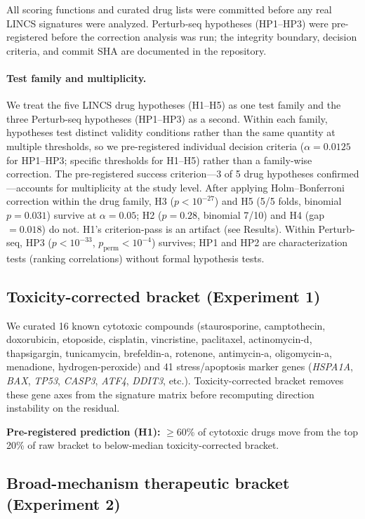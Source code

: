 \documentclass{article}
\begin{document}
All scoring functions and curated drug lists were committed before any real
LINCS signatures were analyzed. Perturb-seq hypotheses (HP1--HP3) were
pre-registered before the correction analysis was run; the integrity
boundary, decision criteria, and commit SHA are documented in the
repository.

\paragraph{Test family and multiplicity.}
We treat the five LINCS drug hypotheses (H1--H5) as one test family and the
three Perturb-seq hypotheses (HP1--HP3) as a second. Within each family,
hypotheses test distinct validity conditions rather than the same quantity at
multiple thresholds, so we pre-registered individual decision criteria
($\alpha = 0.0125$ for HP1--HP3; specific thresholds for H1--H5) rather than
a family-wise correction. The pre-registered success criterion---3 of 5 drug
hypotheses confirmed---accounts for multiplicity at the study level.
After applying Holm--Bonferroni correction within the drug family, H3
($p < 10^{-27}$) and H5 (5/5 folds, binomial $p = 0.031$) survive at
$\alpha = 0.05$; H2 ($p = 0.28$, binomial 7/10) and H4 (gap $= 0.018$)
do not. H1's criterion-pass is an artifact (see Results). Within Perturb-seq,
HP3 ($p < 10^{-33}$, $p_{\text{perm}} < 10^{-4}$) survives; HP1 and HP2 are characterization tests
(ranking correlations) without formal hypothesis tests.

\subsection{Toxicity-corrected bracket (Experiment 1)}

We curated 16 known cytotoxic compounds (staurosporine, camptothecin,
doxorubicin, etoposide, cisplatin, vincristine, paclitaxel, actinomycin-d,
thapsigargin, tunicamycin, brefeldin-a, rotenone, antimycin-a, oligomycin-a,
menadione, hydrogen-peroxide) and 41 stress/apoptosis marker genes
(\emph{HSPA1A}, \emph{BAX}, \emph{TP53}, \emph{CASP3}, \emph{ATF4},
\emph{DDIT3}, etc.). Toxicity-corrected bracket removes these gene axes from
the signature matrix before recomputing direction instability on the residual.

\textbf{Pre-registered prediction (H1):} $\geq$60\% of cytotoxic drugs move
from the top 20\% of raw bracket to below-median toxicity-corrected bracket.

\subsection{Broad-mechanism therapeutic bracket (Experiment 2)}
\end{document}
